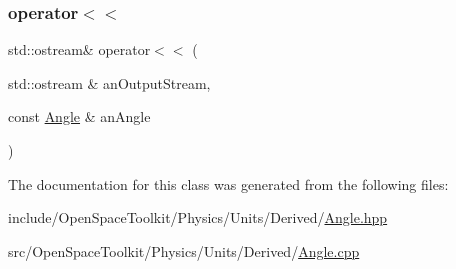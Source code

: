 \subsubsection{\texorpdfstring{operator$<$$<$}{operator<<}}
{\footnotesize\ttfamily std\+::ostream\& operator$<$$<$ (\begin{DoxyParamCaption}\item[{std\+::ostream \&}]{an\+Output\+Stream,  }\item[{const \hyperlink{classostk_1_1physics_1_1units_1_1_angle}{Angle} \&}]{an\+Angle }\end{DoxyParamCaption})\hspace{0.3cm}{\ttfamily [friend]}}



The documentation for this class was generated from the following files\+:\begin{DoxyCompactItemize}
\item 
include/\+Open\+Space\+Toolkit/\+Physics/\+Units/\+Derived/\hyperlink{_angle_8hpp}{Angle.\+hpp}\item 
src/\+Open\+Space\+Toolkit/\+Physics/\+Units/\+Derived/\hyperlink{_angle_8cpp}{Angle.\+cpp}\end{DoxyCompactItemize}
